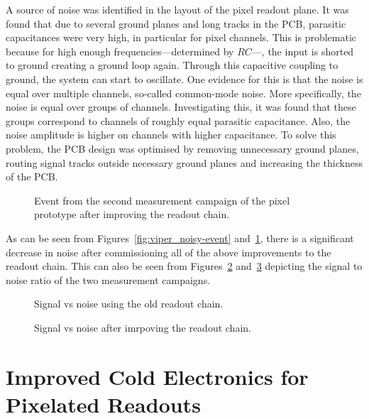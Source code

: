 A source of noise was identified in the layout of the pixel readout plane.
It was found that due to several ground planes and long tracks in the PCB, parasitic capacitances were very high, in particular for pixel channels.
This is problematic because for high enough frequencies---determined by $RC$---, the input is shorted to ground creating a ground loop again.
Through this capacitive coupling to ground, the system can start to oscillate.
One evidence for this is that the noise is equal over multiple channels, so-called common-mode noise.
More specifically, the noise is equal over groups of channels.
Investigating this, it was found that these groups correspond to channels of roughly equal parasitic capacitance.
Also, the noise amplitude is higher on channels with higher capacitance.
To solve this problem, the PCB design was optimised by removing unnecessary ground planes, routing signal tracks outside necessary ground planes and increasing the thickness of the PCB.

\begin{figure}[htb]
	\centering
	\caption{Event from the second measurement campaign of the pixel prototype after improving the readout chain.}
	\label{fig:viper_good-event}
\end{figure}

As can be seen from Figures~\ref{fig:viper_noisy-event} and~\ref{fig:viper_good-event}, there is a significant decrease in noise after commissioning all of the above improvements to the readout chain.
This can also be seen from Figures~\ref{fig:viper_snr-noisy} and~\ref{fig:viper_snr-good} depicting the signal to noise ratio of the two measurement campaigns.

\begin{figure}[htb]
	\centering
	\caption{Signal vs noise using the old readout chain.}
	\label{fig:viper_snr-noisy}
\end{figure}

\begin{figure}[htb]
	\centering
	\caption{Signal vs noise after imrpoving the readout chain.}
	\label{fig:viper_snr-good}
\end{figure}


\section{Improved Cold Electronics for Pixelated Readouts}
\label{sec:electronics_pixels}